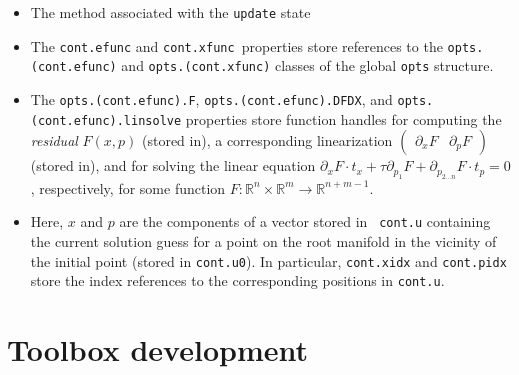 \documentclass{article}
\begin{document}
\begin{itemize}
\item The method associated with the \texttt{update} state

\item The \texttt{cont.efunc} and \texttt{cont.xfunc }properties store
references to the \texttt{opts.(cont.efunc)} and \texttt{opts.(cont.xfunc)}
classes of the global \texttt{opts} structure.

\item The \texttt{opts.(cont.efunc).F}, \texttt{opts.(cont.efunc).DFDX}, and 
\texttt{opts.(cont.efunc).linsolve} properties store function handles for
computing the \emph{residual} $F\left( x,p\right) $ (stored in), a
corresponding linearization $\left( 
\begin{array}{cc}
\partial _{x}F & \partial _{p}F%
\end{array}%
\right) $ (stored in), and for solving the linear equation $\partial
_{x}F\cdot t_{x}+\tau \partial _{p_{1}}F+\partial _{p_{2\ldots n}}F\cdot
t_{p}=0$, respectively, for some function $F:\mathbb{R}^{n}\times \mathbb{R}%
^{m}\rightarrow \mathbb{R}^{n+m-1}$.

\item Here, $x$ and $p$ are the components of a vector stored in \texttt{%
cont.u} containing the current solution guess for a point on the root
manifold in the vicinity of the initial point (stored in \texttt{cont.u0}).
In particular, \texttt{cont.xidx} and \texttt{cont.pidx} store the index
references to the corresponding positions in \texttt{cont.u}.
\end{itemize}

\section{Toolbox development}
\end{document}
